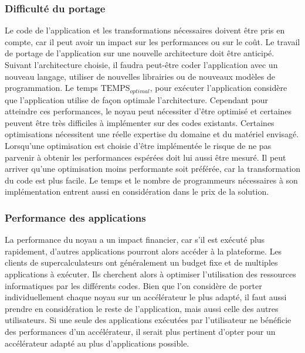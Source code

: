     \subsubsection{Difficulté du portage}
        Le code de l'application  et les transformations nécessaires doivent être pris en compte, car il peut avoir un impact sur les performances ou sur le coût. Le travail de portage de l'application sur une nouvelle architecture doit être anticipé. Suivant l'architecture choisie, il faudra peut-être coder l'application avec un nouveau langage, utiliser de nouvelles librairies ou de nouveaux modèles de programmation. Le temps $\text{TEMPS}_{optimal}$, pour exécuter l'application considère que l'application utilise de façon optimale l'architecture. Cependant pour atteindre ces performances, le noyau peut nécessiter d'être optimisé et certaines peuvent être très difficiles à implémenter sur des codes existants. Certaines optimisations nécessitent une réelle expertise du domaine et du matériel envisagé. Lorsqu'une optimisation est choisie d'être implémentée le risque de ne pas parvenir à obtenir les performances espérées doit lui aussi être mesuré. Il peut arriver qu'une optimisation moins performante soit préférée, car la transformation du code est plus facile. Le temps et le nombre de programmeurs nécessaires à son implémentation entrent aussi en considération dans le prix de la solution.
    
    
    \subsubsection{Performance des applications }
        La performance du noyau a un impact financier, car s'il est exécuté plus rapidement, d'autres applications pourront alors accéder à la plateforme. Les clients de supercalculateurs ont généralement un budget fixe et de multiples applications à exécuter. Ils cherchent alors à optimiser l'utilisation des ressources informatiques par les différents codes. Bien que l'on considère de porter individuellement chaque noyau sur un accélérateur le plus adapté, il faut aussi prendre en considération le reste de l'application, mais aussi celle des autres utilisateurs. Si une seule des applications exécutées par l'utilisateur ne bénéficie des performances d'un accélérateur, il serait plus pertinent d'opter pour un accélérateur adapté au plus d'applications possible. 

                            
